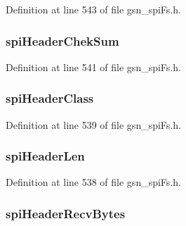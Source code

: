 Definition at line 543 of file gsn\_\-spiFs.h.

\hypertarget{a00232_af37c0fbe674b5a193736b7bc1f65b6fe}{
\subsubsection[{spiHeaderChekSum}]{ {\bf spiHeaderChekSum}}}
\label{a00232_af37c0fbe674b5a193736b7bc1f65b6fe}


Definition at line 541 of file gsn\_\-spiFs.h.

\hypertarget{a00232_a6bad1290acd8cb67171097a170be56cb}{
\subsubsection[{spiHeaderClass}]{ {\bf spiHeaderClass}}}
\label{a00232_a6bad1290acd8cb67171097a170be56cb}


Definition at line 539 of file gsn\_\-spiFs.h.

\hypertarget{a00232_a2be961edbf2f867b1faaae8ccf93fff7}{
\subsubsection[{spiHeaderLen}]{ {\bf spiHeaderLen}}}
\label{a00232_a2be961edbf2f867b1faaae8ccf93fff7}


Definition at line 538 of file gsn\_\-spiFs.h.

\hypertarget{a00232_afcdc62251ccc6fbaa5c6e7a8e1fdc69c}{
\subsubsection[{spiHeaderRecvBytes}]{ {\bf spiHeaderRecvBytes}}}
\label{a00232_afcdc62251ccc6fbaa5c6e7a8e1fdc69c}


